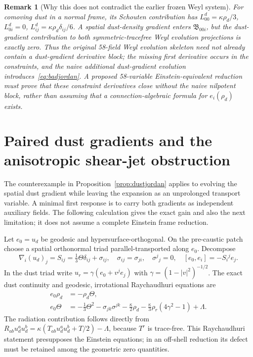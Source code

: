 \documentclass[11pt,a4paper]{article}
\newtheorem{remark}[theorem]{Remark}
\newcommand{\kap}{\kappa}
\begin{document}
\begin{remark}[Why this does not contradict the earlier frozen Weyl system]
For comoving dust in a normal frame, its Schouten contribution has $L^d_{00}=\kap\rho_d/3$, $L^d_{0i}=0$, $L^d_{ij}=\kap\rho_d\delta_{ij}/6$. A spatial dust-density gradient enters $\mathfrak B_{00i}$, but the dust-gradient contribution to both symmetric-tracefree Weyl evolution projections is exactly zero. Thus the original 58-field Weyl \emph{evolution} skeleton need not already contain a dust-gradient derivative block; the missing first derivative occurs in the \emph{constraints}, and the naive additional dust-gradient evolution introduces~\eqref{eq:badjordan}. A proposed 58-variable Einstein-equivalent reduction must prove that these constraint derivatives close without the naive nilpotent block, rather than assuming that a connection-algebraic formula for $e_i(\rho_d)$ exists.
\end{remark}


\section{Paired dust gradients and the anisotropic shear-jet obstruction}\label{sec:a11}
The counterexample in Proposition~\ref{prop:dustjordan} applies to evolving the spatial dust gradient while leaving the expansion as an unprolonged transport variable. A minimal first response is to carry both gradients as independent auxiliary fields. The following calculation gives the exact gain and also the next limitation; it does not assume a complete Einstein frame reduction.

Let $e_0=u_d$ be geodesic and hypersurface-orthogonal. On the pre-caustic patch choose a spatial orthonormal triad parallel-transported along $e_0$. Decompose
\begin{equation}\label{eq:thetaS}
\nabla_i (u_d)_j=S_{ij}=\tfrac13\Theta\delta_{ij}+\sigma_{ij},\quad
\sigma_{ij}=\sigma_{ji},\quad \sigma^j{}_j=0,\quad
[e_0,e_i]=-S_i{}^je_j.
\end{equation}
In the dust triad write $u_r=\gamma(e_0+v^je_j)$ with $\gamma=(1-|v|^2)^{-1/2}$. The exact dust continuity and geodesic, irrotational Raychaudhuri equations are
\begin{align}\label{eq:raycha}
e_0\rho_d&=-\rho_d\Theta,\\
e_0\Theta&=-\tfrac13\Theta^2-\sigma_{jk}\sigma^{jk}
-\tfrac{\kap}{2}\rho_d
-\tfrac{\kap}{3}\rho_r(4\gamma^2-1)+\Lambda.
\end{align}
The radiation contribution follows directly from $R_{ab}u_d^au_d^b=\kap(T_{ab}u_d^au_d^b+T/2)-\Lambda$, because $T^r$ is trace-free. This Raychaudhuri statement presupposes the Einstein equations; in an off-shell reduction its defect must be retained among the geometric zero quantities.
\end{document}
